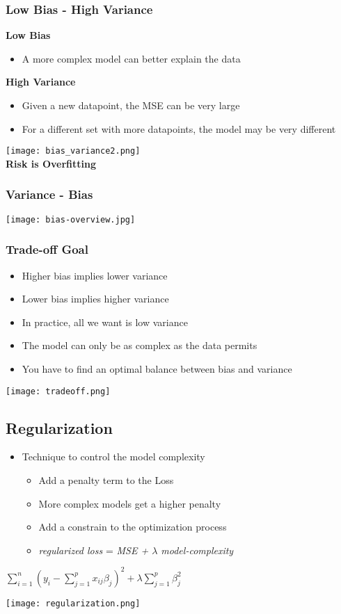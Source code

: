 \subsubsection{Low Bias - High Variance}
\textbf{Low Bias}
\begin{itemize}
    \item A more complex model can better explain the data
\end{itemize}
\textbf{High Variance}
\begin{itemize}
    \item Given a new datapoint, the MSE can be very large
    \item For a different set with more datapoints, the model may be very different
\end{itemize}
\texttt{[image: bias\_variance2.png]}\\
\textbf{Risk is Overfitting}
\subsubsection{Variance - Bias}
\texttt{[image: bias-overview.jpg]}

\subsubsection{Trade-off Goal}
\begin{itemize}
    \item Higher bias implies lower variance
    \item Lower bias implies higher variance
    \item In practice, all we want is low variance
    \item The model can only be as complex as the data permits
    \item You have to find an optimal balance between bias and variance
\end{itemize}
\texttt{[image: tradeoff.png]}

\subsection{Regularization}
\begin{itemize}
    \item Technique to control the model complexity
          \begin{itemize}
              \item Add a penalty term to the Loss
              \item More complex models get a higher penalty
              \item Add a constrain to the optimization process
              \item \textit{regularized loss} = \textit{MSE + $\lambda$ model-complexity}
          \end{itemize}
\end{itemize}
\begin{center}
    $\displaystyle\sum_{i = 1}^{n} (y_i - \displaystyle\sum_{j = 1}^{p} x_{ij}\beta_j)^2 + \lambda \displaystyle\sum_{j = 1}^{p}\beta_j^2$
\end{center}
\texttt{[image: regularization.png]}

